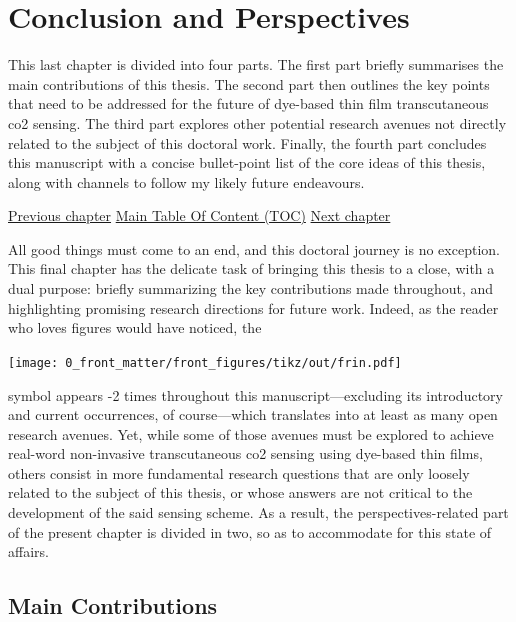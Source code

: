 \chapter{Conclusion and Perspectives}\label{chap:conclusion}

\begin{tldrbox}
	
	This last chapter is divided into four parts. The first part briefly summarises the main contributions of this thesis. The second part then outlines the key points that need to be addressed for the future of dye-based thin film transcutaneous \gls{co2} sensing. The third part explores other potential research avenues not directly related to the subject of this doctoral work. Finally, the fourth part concludes this manuscript with a concise bullet-point list of the core ideas of this thesis, along with channels to follow my likely future endeavours.
	
	\tcblower
	
	\hyperref[chap:thin_film]{Previous chapter} \hfill \hyperref[chapter:toc]{Main Table Of Content (TOC)} \hfill \hyperref[chap:biblio]{Next chapter}

\end{tldrbox}

All good things must come to an end, and this doctoral journey is no exception. This final chapter has the delicate task of bringing this thesis to a close, with a dual purpose: briefly summarizing the key contributions made throughout, and highlighting promising research directions for future work. Indeed, as the reader who loves figures would have noticed, the
\begin{center} \texttt{[image: 0\_front\_matter/front\_figures/tikz/out/frin.pdf]}
\end{center}
\noindent{}symbol appears \the\numexpr\value{mfrincounter}-2\relax{} times throughout this manuscript---excluding its introductory and current occurrences, of course---which translates into at least as many open research avenues. Yet, while some of those avenues must be explored to achieve real-word non-invasive transcutaneous \gls{co2} sensing using dye-based thin films, others consist in more fundamental research questions that are only loosely related to the subject of this thesis, or whose answers are not critical to the development of the said sensing scheme. As a result, the perspectives-related part of the present chapter is divided in two, so as to accommodate for this state of affairs.

\section{Main Contributions}

